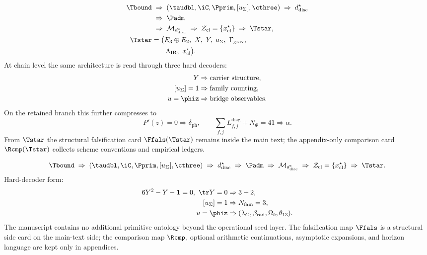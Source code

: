 \begin{tcolorbox}[colback=tfptblue!3, colframe=tfptblue, breakable,
    title={Closed TFPT Chain}, colbacktitle=tfptblue]
\begin{equation}
\label{eq:compiler-chain}
\begin{aligned}
\Tbound
&\;\Rightarrow\;
(\taudbl,\iC,\Pprim,[u_\Sigma],\cthree)
\;\Rightarrow\;
d^\star_{\mathrm{disc}}\\
&\;\Rightarrow\;
\Padm
\\
&\;\Rightarrow\;
\mathcal M_{d^\star_{\mathrm{disc}}}
\;\Rightarrow\;
\mathcal Z_{\mathrm{cl}}=\{x^\star_{\mathrm{cl}}\}
\;\Rightarrow\;
\Tstar,\\
\Tstar
&=
\bigl(
E_3\oplus E_2,\ X,\ Y,\ a_\Sigma,\ \Gamma_{\mathrm{grav}},\\
&\qquad
\Lambda_{\mathrm{IR}},\ x_{\mathrm{cl}}^\star
\bigr).
\end{aligned}
\end{equation}
At chain level the same architecture is read through three hard decoders:
\[
\begin{aligned}
Y&\Rightarrow \text{carrier structure},\\
[u_\Sigma]=1&\Rightarrow \text{family counting},\\
u=\phiz&\Rightarrow \text{bridge observables}.
\end{aligned}
\]
On the retained branch this further compresses to
\[
P'(z)=0\Rightarrow \delta_{\mathrm{ph}},
\qquad
\sum_{f,j}L_{f,j}^{\mathrm{diag}}+N_\Phi=41\Rightarrow \alpha.
\]
From $\Tstar$ the structural falsification card $\Ffals(\Tstar)$ remains inside the main text;
the appendix-only comparison card $\Rcmp(\Tstar)$ collects scheme conventions and empirical
ledgers.
\end{tcolorbox}

\begin{tcolorbox}[colback=tfptorange!4, colframe=tfptorange!80!black, breakable,
    title={Closed Theorem Stack in the Present Version}, colbacktitle=tfptorange!85!black]
\[
\Tbound
\;\Rightarrow\;
(\taudbl,\iC,\Pprim,[u_\Sigma],\cthree)
\;\Rightarrow\;
d^\star_{\mathrm{disc}}
\;\Rightarrow\;
\Padm
\;\Rightarrow\;
\mathcal M_{d^\star_{\mathrm{disc}}}
\;\Rightarrow\;
\mathcal Z_{\mathrm{cl}}=\{x^\star_{\mathrm{cl}}\}
\;\Rightarrow\;
\Tstar.
\]
Hard-decoder form:
\[
\begin{aligned}
6Y^2-Y-\mathbf 1=0,\ \tr Y=0
&\Rightarrow
3+2,\\
[u_\Sigma]=1
&\Rightarrow
N_{\mathrm{fam}}=3,\\
u=\phiz
&\Rightarrow
(\lambda_C,\beta_{\mathrm{rad}},\Omega_b,\theta_{13}).
\end{aligned}
\]
The manuscript contains no additional primitive ontology beyond the operational seed layer. The
falsification map $\Ffals$ is a structural side card on the main-text side; the comparison map
$\Rcmp$, optional arithmetic continuations, asymptotic expansions, and horizon language are
kept only in appendices.
\end{tcolorbox}

